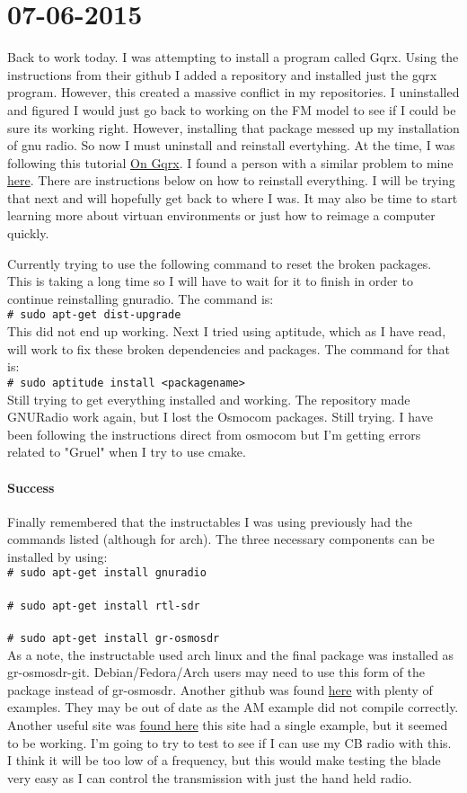 \documentclass{article}
\newcommand{\shellcmd}[1]{\\\indent\indent\texttt{\footnotesize\# #1}\\}
\begin{document}
	\section{07-06-2015}
	Back to work today. I was attempting to install a program called Gqrx. Using the instructions from their github
	I added a repository and installed just the gqrx program. However, this created a massive conflict in my repositories. I 
	uninstalled and figured I would just go back to working on the FM model to see if I could be sure its working right. However,
	installing that package messed up my installation of gnu radio. So now I must uninstall and reinstall evertyhing. At the time, I was following this tutorial \href{https://github.com/mossmann/hackrf/wiki/Installing-gnuradio-on-Ubuntu-14.04-with-the-packaging-manager}{On Gqrx}. I found a person with a similar problem to mine \href{https://github.com/kpreid/shinysdr/issues/12}{here}. 
	There are instructions below on how to reinstall everything. I will be trying that next and will hopefully get back to where
	I was. It may also be time to start learning more about virtuan environments or just how to reimage a computer quickly.	 

	Currently trying to use the following command to reset the broken packages. This is taking a long time so I will have to wait
	for it to finish in order to continue reinstalling gnuradio. The command is:\shellcmd{sudo apt-get dist-upgrade}	
	This did not end up working. Next I tried using aptitude, which as I have read, will work to fix these broken dependencies and
	packages. The command for that is: \shellcmd{sudo aptitude install <packagename>}
	Still trying to get everything installed and working. The repository made GNURadio work again, but I lost the Osmocom
	packages. Still trying. I have been following the instructions direct from osmocom but I'm getting errors related to
	"Gruel" when I try to use cmake. 
	\paragraph{Success}
	Finally remembered that the instructables I was using previously had the commands listed (although for arch). The three
	necessary components can be installed by using:\shellcmd{sudo apt-get install gnuradio}\shellcmd{sudo apt-get install rtl-sdr}\shellcmd{sudo apt-get install gr-osmosdr}
	As a note, the instructable used arch linux and the final package was installed as gr-osmosdr-git. Debian/Fedora/Arch users
	may need to use this form of the package instead of gr-osmosdr. Another github was found \href{https://github.com/csete/gnuradio-grc-examples}{here} with plenty of examples. They may be out of date as the AM example did not compile correctly. Another useful site was \href{https://tapiovalli.wordpress.com/2014/08/02/rtl-sdr-gnu-radio-and-building-my-own-am-receiver/}{found here} this site had
	a single example, but it seemed to be working. I'm going to try to test to see if I can use my CB radio with this. I 
	think it will be too low of a frequency, but this would make testing the blade very easy as I can control the transmission
	with just the hand held radio. 
\end{document}
